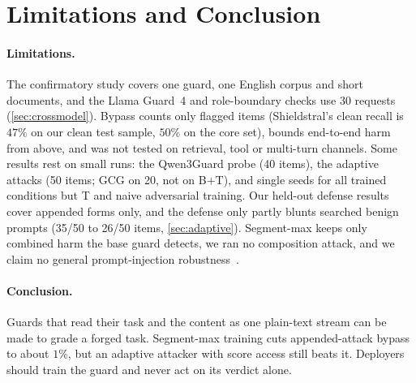 \section{Limitations and Conclusion}
\label{sec:discussion}\label{sec:limitations}

\paragraph{Limitations.}
The confirmatory study covers one guard, one English corpus and short documents, and the Llama Guard~4 and role-boundary checks use 30 requests (\cref{sec:crossmodel}). Bypass counts only flagged items (Shieldstral's clean recall is $47\%$ on our clean test sample, $50\%$ on the core set), bounds end-to-end harm from above, and was not tested on retrieval, tool or multi-turn channels. %
Some results rest on small runs: the Qwen3Guard probe (40 items), the adaptive attacks (50 items; GCG on 20, not on B$+$T), and single seeds for all trained conditions but T and naive adversarial training.
Our held-out defense results cover appended forms only, and the defense only partly blunts searched benign prompts (35/50 to 26/50 items, \cref{sec:adaptive}). %
Segment-max keeps only combined harm the base guard detects, we ran no composition attack, and we claim no general prompt-injection robustness~\citep{pant2026inseparability}.

\paragraph{Conclusion.}
Guards that read their task and the content as one plain-text stream can be made to grade a forged task. Segment-max training cuts appended-attack bypass to about $1\%$, but an adaptive attacker with score access still beats it. Deployers should train the guard and never act on its verdict alone.
